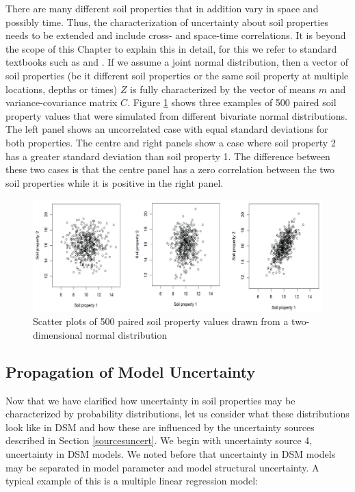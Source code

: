 \documentclass[10pt,b5paper,]{book}
\theoremstyle{definition}
\theoremstyle{definition}
\theoremstyle{definition}
\theoremstyle{remark}
\begin{document}
There are many different soil properties that in addition vary in space
and possibly time. Thus, the characterization of uncertainty about soil
properties needs to be extended and include cross- and space-time
correlations. It is beyond the scope of this Chapter to explain this in
detail, for this we refer to standard textbooks such as
\cite{goovaerts1997geostatistics} and \cite{webster_2007}. If we assume
a joint normal distribution, then a vector of soil properties (be it
different soil properties or the same soil property at multiple
locations, depths or times) \(Z\) is fully characterized by the vector
of means \(m\) and variance-covariance matrix \(C\). Figure
\ref{fig:pairedsoils} shows three examples of 500 paired soil property
values that were simulated from different bivariate normal
distributions. The left panel shows an uncorrelated case with equal
standard deviations for both properties. The centre and right panels
show a case where soil property 2 has a greater standard deviation than
soil property 1. The difference between these two cases is that the
centre panel has a zero correlation between the two soil properties
while it is positive in the right panel.

\begin{figure}

{\centering \includegraphics[width=0.8\linewidth]{images/pairedsoilpropierties} 

}

\caption{Scatter plots of 500 paired soil property values drawn from a two-dimensional normal distribution}\label{fig:pairedsoils}
\end{figure}

\hypertarget{propagation-of-model-uncertainty}{%
\subsection{Propagation of Model
Uncertainty}\label{propagation-of-model-uncertainty}}

Now that we have clarified how uncertainty in soil properties may be
characterized by probability distributions, let us consider what these
distributions look like in DSM and how these are influenced by the
uncertainty sources described in Section \ref{sourcesuncert}. We begin
with uncertainty source 4, uncertainty in DSM models. We noted before
that uncertainty in DSM models may be separated in model parameter and
model structural uncertainty. A typical example of this is a multiple
linear regression model:
\end{document}
